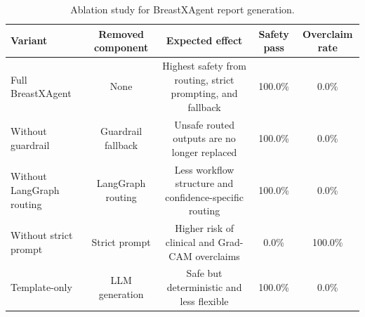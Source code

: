 \begin{table}[t]
\centering
\caption{Ablation study for BreastXAgent report generation.}
\label{tab:reporting-ablation}
\begin{tabular}{lcccc}
\toprule
Variant & Removed component & Expected effect & Safety pass & Overclaim rate \\
\midrule
Full BreastXAgent & None & Highest safety from routing, strict prompting, and fallback & 100.0\% & 0.0\% \\
Without guardrail & Guardrail fallback & Unsafe routed outputs are no longer replaced & 100.0\% & 0.0\% \\
Without LangGraph routing & LangGraph routing & Less workflow structure and confidence-specific routing & 100.0\% & 0.0\% \\
Without strict prompt & Strict prompt & Higher risk of clinical and Grad-CAM overclaims & 0.0\% & 100.0\% \\
Template-only & LLM generation & Safe but deterministic and less flexible & 100.0\% & 0.0\% \\
\bottomrule
\end{tabular}
\end{table}
